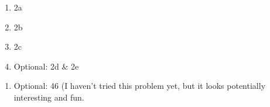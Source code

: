 \documentclass[12pt]{article}
\begin{document}
\begin{enumerate}
\setlength{\itemsep}{-1mm}
\item 2a
\item 2b
\item 2c
\item Optional: 2d \& 2e
\end{enumerate}

\begin{enumerate}
\setlength{\itemsep}{-1mm}
\item Optional: 46 (I haven't tried this problem yet, but it looks
  potentially interesting and fun.
\end{enumerate}
\end{document}
